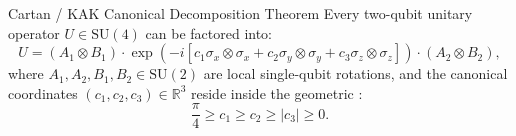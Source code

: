 \begin{theorembox}{Cartan / KAK Canonical Decomposition Theorem}
Every two-qubit unitary operator $U \in \text{SU}(4)$ can be factored into:
\begin{equation}
    U = (A_1 \otimes B_1) \cdot \exp\left( -i \left[ c_1 \sigma_x \otimes \sigma_x + c_2 \sigma_y \otimes \sigma_y + c_3 \sigma_z \otimes \sigma_z \right] \right) \cdot (A_2 \otimes B_2),
    \label{eq:kak_canonical_form}
\end{equation}
where $A_1, A_2, B_1, B_2 \in \text{SU}(2)$ are local single-qubit rotations, and the canonical coordinates $(c_1, c_2, c_3) \in \mathbb{R}^3$ reside inside the geometric :
\begin{equation}
    \frac{\pi}{4} \ge c_1 \ge c_2 \ge |c_3| \ge 0.
    \label{eq:weyl_chamber_bounds}
\end{equation}
\end{theorembox}

